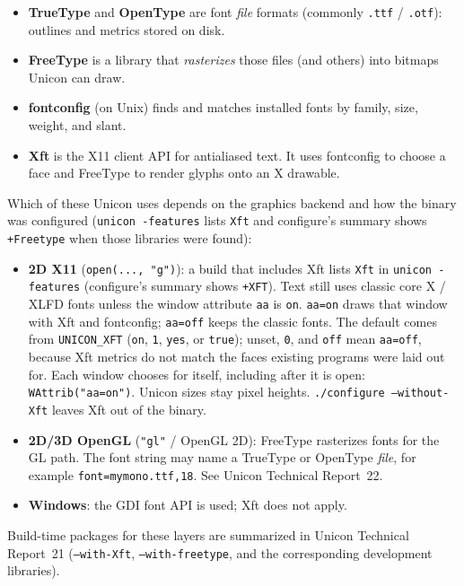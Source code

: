 \begin{itemize}\itemsep0pt
\item \textbf{TrueType} and \textbf{OpenType} are font \emph{file}
  formats (commonly \texttt{.ttf} / \texttt{.otf}): outlines and
  metrics stored on disk.
\item \textbf{FreeType} is a library that \emph{rasterizes} those
  files (and others) into bitmaps Unicon can draw.
\item \textbf{fontconfig} (on Unix) finds and matches installed fonts
  by family, size, weight, and slant.
\item \textbf{Xft} is the X11 client API for antialiased text. It uses
  fontconfig to choose a face and FreeType to render glyphs onto an
  X drawable.
\end{itemize}

Which of these Unicon uses depends on the graphics backend and how
the binary was configured (\texttt{unicon -features} lists
\texttt{Xft} and configure's summary shows \texttt{+Freetype}
when those libraries were found):

\begin{itemize}\itemsep0pt
\item \textbf{2D X11} (\texttt{open(..., "g")}): a build that
  includes Xft lists \texttt{Xft} in \texttt{unicon -features}
  (configure's summary shows \texttt{+XFT}). Text still uses classic
  core X / XLFD fonts unless the window attribute \texttt{aa} is
  \texttt{on}. \texttt{aa=on} draws that window with Xft and
  fontconfig; \texttt{aa=off} keeps the classic fonts. The default
  comes from \texttt{UNICON\_XFT} (\texttt{on}, \texttt{1},
  \texttt{yes}, or \texttt{true}); unset, \texttt{0}, and
  \texttt{off} mean \texttt{aa=off}, because Xft metrics do not
  match the faces existing programs were laid out for. Each window
  chooses for itself, including after it is open:
  \texttt{WAttrib("aa=on")}. Unicon sizes stay pixel heights.
  \texttt{./configure --without-Xft} leaves Xft out of the binary.
\item \textbf{2D/3D OpenGL} (\texttt{"gl"} / OpenGL 2D): FreeType
  rasterizes fonts for the GL path. The font string may name a
  TrueType or OpenType \emph{file}, for example
  \texttt{font=mymono.ttf,18}. See Unicon Technical Report~22.
\item \textbf{Windows}: the GDI font API is used; Xft does not apply.
\end{itemize}

Build-time packages for these layers are summarized in Unicon
Technical Report~21 (\texttt{--with-Xft}, \texttt{--with-freetype},
and the corresponding development libraries).

